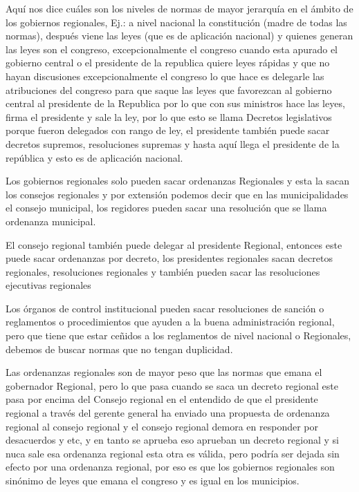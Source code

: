 \documentclass[
  letterpaper,
  DIV=11,
  numbers=noendperiod]{scrartcl}
\begin{document}
Aquí nos dice cuáles son los niveles de normas de mayor jerarquía en el
ámbito de los gobiernos regionales, Ej.: a nivel nacional la
constitución (madre de todas las normas), después viene las leyes (que
es de aplicación nacional) y quienes generan las leyes son el congreso,
excepcionalmente el congreso cuando esta apurado el gobierno central o
el presidente de la republica quiere leyes rápidas y que no hayan
discusiones excepcionalmente el congreso lo que hace es delegarle las
atribuciones del congreso para que saque las leyes que favorezcan al
gobierno central al presidente de la Republica por lo que con sus
ministros hace las leyes, firma el presidente y sale la ley, por lo que
esto se llama Decretos legislativos porque fueron delegados con rango de
ley, el presidente también puede sacar decretos supremos, resoluciones
supremas y hasta aquí llega el presidente de la república y esto es de
aplicación nacional.

Los gobiernos regionales solo pueden sacar ordenanzas Regionales y esta
la sacan los consejos regionales y por extensión podemos decir que en
las municipalidades el consejo municipal, los regidores pueden sacar una
resolución que se llama ordenanza municipal.

El consejo regional también puede delegar al presidente Regional,
entonces este puede sacar ordenanzas por decreto, los presidentes
regionales sacan decretos regionales, resoluciones regionales y también
pueden sacar las resoluciones ejecutivas regionales

Los órganos de control institucional pueden sacar resoluciones de
sanción o reglamentos o procedimientos que ayuden a la buena
administración regional, pero que tiene que estar ceñidos a los
reglamentos de nivel nacional o Regionales, debemos de buscar normas que
no tengan duplicidad.

Las ordenanzas regionales son de mayor peso que las normas que emana el
gobernador Regional, pero lo que pasa cuando se saca un decreto regional
este pasa por encima del Consejo regional en el entendido de que el
presidente regional a través del gerente general ha enviado una
propuesta de ordenanza regional al consejo regional y el consejo
regional demora en responder por desacuerdos y etc, y en tanto se
aprueba eso aprueban un decreto regional y si nuca sale esa ordenanza
regional esta otra es válida, pero podría ser dejada sin efecto por una
ordenanza regional, por eso es que los gobiernos regionales son sinónimo
de leyes que emana el congreso y es igual en los municipios.
\end{document}
